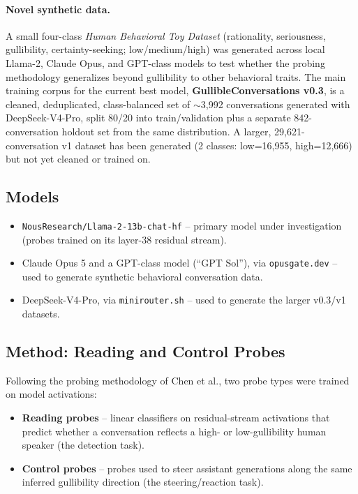 \documentclass[11pt]{article}
\begin{document}
\paragraph{Novel synthetic data.} A small four-class \emph{Human Behavioral Toy Dataset} (rationality, seriousness, gullibility, certainty-seeking; low/medium/high) was generated across local Llama-2, Claude Opus, and GPT-class models to test whether the probing methodology generalizes beyond gullibility to other behavioral traits. The main training corpus for the current best model, \textbf{GullibleConversations v0.3}, is a cleaned, deduplicated, class-balanced set of $\sim$3,992 conversations generated with DeepSeek-V4-Pro, split 80/20 into train/validation plus a separate 842-conversation holdout set from the same distribution. A larger, 29,621-conversation v1 dataset has been generated (2 classes: low=16,955, high=12,666) but not yet cleaned or trained on.

\subsection{Models}

\begin{itemize}[nosep]
    \item \texttt{NousResearch/Llama-2-13b-chat-hf} -- primary model under investigation (probes trained on its layer-38 residual stream).
    \item Claude Opus 5 and a GPT-class model (``GPT Sol''), via \texttt{opusgate.dev} -- used to generate synthetic behavioral conversation data.
    \item DeepSeek-V4-Pro, via \texttt{minirouter.sh} -- used to generate the larger v0.3/v1 datasets.
\end{itemize}

\subsection{Method: Reading and Control Probes}

Following the probing methodology of Chen et al., two probe types were trained on model activations:

\begin{itemize}[nosep]
    \item \textbf{Reading probes} -- linear classifiers on residual-stream activations that predict whether a conversation reflects a high- or low-gullibility human speaker (the detection task).
    \item \textbf{Control probes} -- probes used to steer assistant generations along the same inferred gullibility direction (the steering/reaction task).
\end{itemize}
\end{document}
